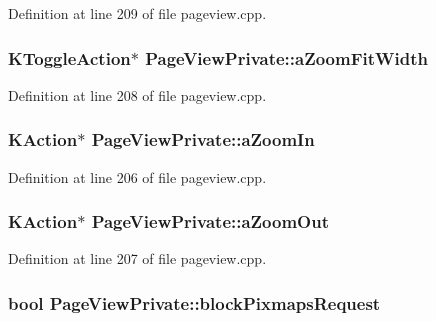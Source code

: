 Definition at line 209 of file pageview.\+cpp.

\hypertarget{classPageViewPrivate_a251dae24330598db9ee9b7eb6015be3b}{
\subsubsection[{a\+Zoom\+Fit\+Width}]{\setlength{\rightskip}{0pt plus 5cm}K\+Toggle\+Action$\ast$ Page\+View\+Private\+::a\+Zoom\+Fit\+Width}}\label{classPageViewPrivate_a251dae24330598db9ee9b7eb6015be3b}


Definition at line 208 of file pageview.\+cpp.

\hypertarget{classPageViewPrivate_a07171f9e585da785aba41e84bf6014fb}{
\subsubsection[{a\+Zoom\+In}]{\setlength{\rightskip}{0pt plus 5cm}K\+Action$\ast$ Page\+View\+Private\+::a\+Zoom\+In}}\label{classPageViewPrivate_a07171f9e585da785aba41e84bf6014fb}


Definition at line 206 of file pageview.\+cpp.

\hypertarget{classPageViewPrivate_a193ef99e27c1d7c1b1741e33ada152ec}{
\subsubsection[{a\+Zoom\+Out}]{\setlength{\rightskip}{0pt plus 5cm}K\+Action$\ast$ Page\+View\+Private\+::a\+Zoom\+Out}}\label{classPageViewPrivate_a193ef99e27c1d7c1b1741e33ada152ec}


Definition at line 207 of file pageview.\+cpp.

\hypertarget{classPageViewPrivate_ac565de32d210643820d0c2d405e8f360}{
\subsubsection[{block\+Pixmaps\+Request}]{\setlength{\rightskip}{0pt plus 5cm}bool Page\+View\+Private\+::block\+Pixmaps\+Request}}\label{classPageViewPrivate_ac565de32d210643820d0c2d405e8f360}


